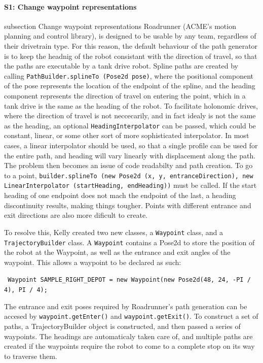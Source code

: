 \documentclass{article}
\begin{document}
\paragraph{S1: Change waypoint representations}
subsection {Change waypoint representations}
Roadrunner (ACME's motion planning and control library), is designed to be usable by any team, regardless of their drivetrain type. For this reason, the default behaviour of the path generator is to keep the headnig of the robot consistant with the direction of travel, so that the paths are executable by a tank drive robot. Spline paths are created by calling \texttt{PathBuilder.splineTo (Pose2d pose)}, where the positional component of the pose represents the location of the endpoint of the spline, and the heading component represents the direction of travel on entering the point, which in a tank drive is the same as the heading of the robot. To facilitate holonomic drives, where the direction of travel is not neccecarily, and in fact idealy is not the same as the heading, an optional \texttt{HeadingInterpolator} can be passed, which could be constant, linear, or some other sort of more sophisticated interpolator. In most cases, a linear interpolator should be used, so that a single profile can be used for the entire path, and heading will vary linearly with displacement along the path. The problem then becomes an issue of code readabilty and path creation. To go to a point, \texttt{builder.splineTo (new Pose2d (x, y, entranceDirection), new LinearInterpolator (startHeading, endHeading))} must be called. If the start heading of one endpoint does not mach the endpoint of the last, a heading discontinuity results, making things tougher. Points with different entrance and exit directions are also more dificult to create.

To resolve this, Kelly created two new classes, a \texttt{Waypoint} class, and a \texttt{TrajectoryBuilder} class. A \texttt{Waypoint} contains a Pose2d to store the position of the robot at the Waypoint, as well as the entrance and exit angles of the waypoint. This allows a waypoint to be declared as such:

 \lstinline{ Waypoint SAMPLE_RIGHT_DEPOT = new Waypoint(new Pose2d(48, 24, -PI / 4), PI / 4); }

The entrance and exit poses required by Roadrunner's path generation can be accesed by \texttt{waypoint.getEnter()} and \texttt{waypoint.getExit()}. To construct a set of paths, a TrajectoryBuilder object is constructed, and then passed a series of waypoints. The headings are automaticaly taken care of, and multiple paths are created if the waypoints require the robot to come to a complete stop on its way to traverse them. 
\end{document}
